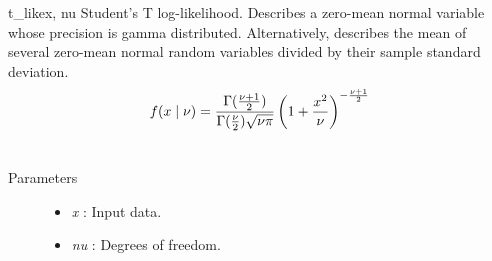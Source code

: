 \hypertarget{pymc.distributions.t_like}{}\begin{funcdesc}{t\_like}{x, nu}
Student's T log-likelihood. Describes a zero-mean normal variable whose precision is
gamma distributed. Alternatively, describes the mean of several zero-mean normal
random variables divided by their sample standard deviation.
\begin{gather}
\begin{split}f(x \mid \nu) = \frac{\Gamma(\frac{\nu+1}{2})}{\Gamma(\frac{\nu}{2}) \sqrt{\nu\pi}} \left( 1 + \frac{x^2}{\nu} \right)^{-\frac{\nu+1}{2}}\end{split}\notag\\\begin{split}\end{split}\notag
\end{gather}\begin{description}
\item[Parameters] \leavevmode\begin{itemize}
\item {}
\emph{x} : Input data.

\item {}
\emph{nu} : Degrees of freedom.

\end{itemize}

\end{description}
\end{funcdesc}

